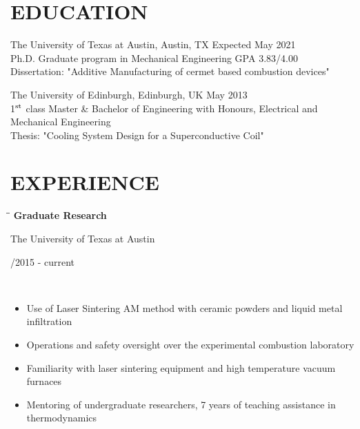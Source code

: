 \documentclass[11pt]{res}
\begin{document}
\begin{resume}

\vspace{-10pt}
\section{EDUCATION} 

\vspace{2pt}
	The University of Texas at Austin, Austin, TX \hfill Expected May 2021\\
	Ph.D. Graduate program in Mechanical Engineering \hfill GPA 3.83/4.00 \\[1pt]
	Dissertation: "Additive Manufacturing of cermet based combustion devices"
	
\vspace{-10pt}
	The University of Edinburgh, Edinburgh, UK \hfill May 2013 \\        
	1$^\textnormal{st}$ class Master \& Bachelor of Engineering with Honours, Electrical and Mechanical Engineering   \\[1pt]
	Thesis: "Cooling System Design for a Superconductive Coil"

\vspace{-13pt}
\section{EXPERIENCE}
 \vspace{-8pt}

   \begin{tabbing}
   \hspace{2.3in}\= \hspace{2.7in}\= \kill %
    {\bf Graduate Research} \> \parbox[c]{7.5cm}{ \centering The University of Texas at Austin }    \> \parbox[c]{3.8cm}{ /2015 - current} \\
   \end{tabbing}
   \vspace{-18pt}      %
   
	\begin{itemize}
   	\setlength{\leftmargin}{-15pt} \setlength\itemsep{0pt}
	\item Use of Laser Sintering AM method with ceramic powders and liquid metal infiltration
	\item Operations and safety oversight over the experimental combustion laboratory
	\item Familiarity with laser sintering equipment and high temperature vacuum furnaces
	\item Mentoring of undergraduate researchers, 7 years of teaching assistance in  thermodynamics
	\end{itemize}
	

\end{resume}
\end{document}
